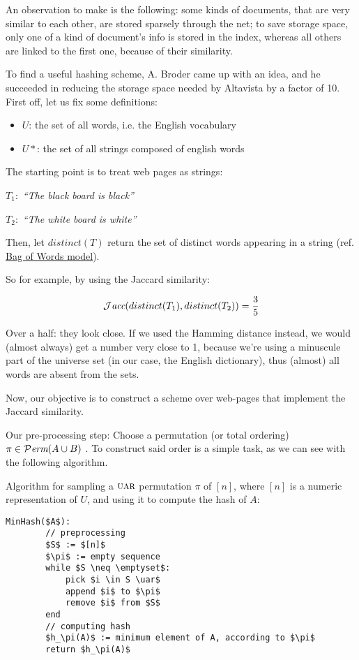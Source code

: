 	An observation to make is the following: some kinds of documents, that are very similar to each other, are stored sparsely through the net; to save storage space, only one of a kind of document's info is stored in the index, whereas all others are linked to the first one, because of their similarity.
	
	To find a useful hashing scheme, A. Broder came up with an idea, and he succeeded in reducing the storage space needed by Altavista by a factor of 10.\\
	First off, let us fix some definitions:
	\begin{itemize}
	\item $U$: the set of all words, i.e. the English vocabulary
	\item $U*$: the set of all strings composed of english words
	\end{itemize}
	
	The starting point is to treat web pages as strings:
	
	$T_1:$ \textit{``The black board is black''}
	
	$T_2:$ \textit{``The white board is white''}
	
	Then, let $distinct(T)$ return the set of distinct words appearing in a string (ref. \href{https://en.wikipedia.org/wiki/Bag-of-words_model}{Bag of Words model}).
	
	So for example, by using the Jaccard similarity:
    
    \begin{equation}
    \mathcal{J}\textit{acc}(distinct(T_1), distinct(T_2))= \frac{3}{5}
    \end{equation}
	
	Over a half: they look close. If we used the Hamming distance instead, we would (almost always) get a number very close to 1, because we're using a minuscule part of the universe set (in our case, the English dictionary), thus (almost) all words are absent from the sets.
	
	Now, our objective is to construct a scheme over web-pages that implement the Jaccard similarity.

	Our pre-processing step: Choose a permutation (or total ordering) $\pi \in \mathcal{P}\textit{erm}(A \cup B)$ \uar. To construct said order is a simple task, as we can see with the following algorithm.
	
	\newpage
	Algorithm for sampling a $\textsc{uar}$ permutation $\pi$ of $[n]$, where $[n]$ is a numeric representation of $U$, and using it to compute the hash of $A$:
	\begin{lstlisting}[caption={min hash or shingles algorithm},label={lst:min_hash}]
	MinHash($A$):
	    // preprocessing
	    $S$ := $[n]$
	    $\pi$ := empty sequence
	    while $S \neq \emptyset$:
	        pick $i \in S \uar$
	        append $i$ to $\pi$
	        remove $i$ from $S$
	    end
	    // computing hash
	    $h_\pi(A)$ := minimum element of A, according to $\pi$
	    return $h_\pi(A)$
	\end{lstlisting}
	
